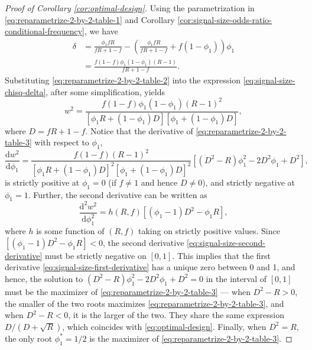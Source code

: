 \begin{proof}[Proof of Corollary \ref{cor:optimal-design}]
Using the parametrization in \eqref{eq:reparametrize-2-by-2-table-1} and Corollary \ref{cor:signal-size-odds-ratio-conditional-frequency}, we have
\begin{align}
    \delta &= \frac{\phi_1 fR}{fR+1-f} - \left(\frac{\phi_1 fR}{fR+1-f} + f(1-\phi_1)\right)\phi_1 \nonumber \\
    &= \frac{f(1-f)\phi_1(1-\phi_1)(R-1)}{fR+1-f}. \label{eq:reparametrize-2-by-2-table-2}
\end{align}
Substituting \eqref{eq:reparametrize-2-by-2-table-2} into the expression \eqref{eq:signal-size-chisq-delta}, after some simplification, yields
\begin{equation} \label{eq:reparametrize-2-by-2-table-3}
    w^2 = \frac{f(1-f)\phi_1(1-\phi_1)(R-1)^2}{\left[\phi_1 R + (1-\phi_1)D\right]\left[\phi_1 + (1-\phi_1)D\right]},
\end{equation}
where $D = fR+1-f$.
Notice that the derivative of \eqref{eq:reparametrize-2-by-2-table-3} with respect to $\phi_1$,
\begin{equation} \label{eq:signal-size-first-derivative}
    \frac{\mathrm{d}w^2}{\mathrm{d}\phi_1} = 
    \frac{f(1-f)(R-1)^2}{\left[\phi_1 R+(1-\phi_1)D\right]^2 \left[\phi_1+(1-\phi_1)D\right]^2} \left[(D^2-R)\phi_1^2 - 2D^2\phi_1 + D^2\right],
\end{equation}
is strictly positive at $\phi_1=0$ (if $f\neq1$ and hence $D\neq0$), and strictly negative at $\phi_1=1$.
Further, the second derivative can be written as
\begin{equation} \label{eq:signal-size-second-derivative}
    \frac{\mathrm{d}^2w^2}{\mathrm{d}\phi_1^2} = 
    h(R,f) \left[(\phi_1-1)D^2 - \phi_1R\right],
\end{equation}
where $h$ is some function of $(R,f)$ taking on strictly positive values.
Since $\left[(\phi_1-1)D^2 - \phi_1R\right]<0$, the second derivative \eqref{eq:signal-size-second-derivative} must be strictly negative on $[0,1]$.
This implies that the first derivative \eqref{eq:signal-size-first-derivative} has a unique zero between 0 and 1, and hence, the solution to $(D^2-R)\phi_1^2 - 2D^2\phi_1 + D^2 = 0$ in the interval of $[0,1]$ must be the maximizer of \eqref{eq:reparametrize-2-by-2-table-3} --- when $D^2-R>0$, the smaller of the two roots maximizes \eqref{eq:reparametrize-2-by-2-table-3}, and when $D^2-R<0$, it is the larger of the two.
They share the same expression ${D}/{(D+\sqrt{R})}$, which coincides with \eqref{eq:optimal-design}.
Finally, when $D^2=R$, the only root $\phi_1^*=1/2$ is the maximizer of \eqref{eq:reparametrize-2-by-2-table-3}.
\end{proof}
